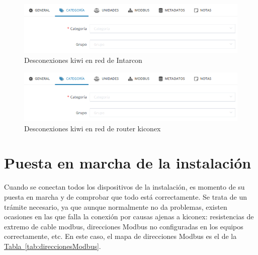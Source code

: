 \begin{figure}[H]
  \centering
  \includegraphics[width=\textwidth, keepaspectratio]{img/lib1}
  \caption{Desconexiones kiwi en red de Intarcon}
  \label{figura:erroresIntarcon}
\end{figure}

\begin{figure}[H]
  \centering
  \includegraphics[width=\textwidth, keepaspectratio]{img/lib1}
  \caption{Desconexiones kiwi en red de router kiconex}
  \label{figura:erroresRouter}
\end{figure}

\vspace{10mm}

\section{Puesta en marcha de la instalación}
\label{sec:altaInstalación}

Cuando se conectan todos los dispositivos de la instalación, es momento de su puesta en marcha y de comprobar que todo está correctamente. Se trata de un trámite necesario, ya que aunque normalmente no da problemas, existen ocasiones en las que falla la conexión por causas ajenas a kiconex: resistencias de extremo de cable modbus, direcciones Modbus no configuradas en los equipos correctamente, etc. En este caso, el mapa de direcciones Modbus es el de la \hyperref[tab:direccionesModbus]{Tabla~\ref{tab:direccionesModbus}}.


